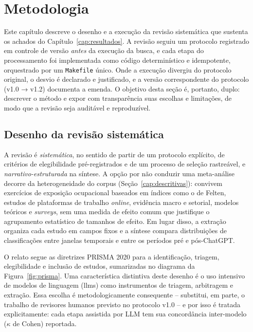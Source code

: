 \chapter{Metodologia}\label{cap:metodologia}

Este capítulo descreve o desenho e a execução da revisão sistemática que sustenta os achados do Capítulo~\ref{cap:resultados}. A revisão seguiu um protocolo registrado em controle de versão \emph{antes} da execução da busca, e cada etapa do processamento foi implementada como código determinístico e idempotente, orquestrado por um \texttt{Makefile} único. Onde a execução divergiu do protocolo original, o desvio é declarado e justificado, e a versão correspondente do protocolo (v1.0 → v1.2) documenta a emenda. O objetivo desta seção é, portanto, duplo: descrever o método e expor com transparência suas escolhas e limitações, de modo que a revisão seja auditável e reproduzível.

\section{Desenho da revisão sistemática}

A revisão é \emph{sistemática}, no sentido de partir de um protocolo explícito, de critérios de elegibilidade pré-registrados e de um processo de seleção rastreável, e \emph{narrativo-estruturada} na síntese. A opção por não conduzir uma meta-análise decorre da heterogeneidade do corpus (Seção~\ref{cap:descritivas}): convivem exercícios de exposição ocupacional baseados em índices como o de Felten, estudos de plataformas de trabalho \textit{online}, evidência macro e setorial, modelos teóricos e \textit{surveys}, sem uma medida de efeito comum que justifique o agrupamento estatístico de tamanhos de efeito. Em lugar disso, a extração organiza cada estudo em campos fixos e a síntese compara distribuições de classificações entre janelas temporais e entre os períodos pré e pós-ChatGPT.

O relato segue as diretrizes PRISMA 2020 para a identificação, triagem, elegibilidade e inclusão de estudos, sumarizadas no diagrama da Figura~\ref{fig:prisma}. Uma característica distintiva deste desenho é o uso intensivo de modelos de linguagem (\glspl{llm}) como instrumentos de triagem, arbitragem e extração. Essa escolha é metodologicamente consequente -- substitui, em parte, o trabalho de revisores humanos previsto no protocolo v1.0 -- e por isso é tratada explicitamente: cada etapa assistida por LLM tem sua concordância inter-modelo ($\kappa$ de Cohen) reportada.

